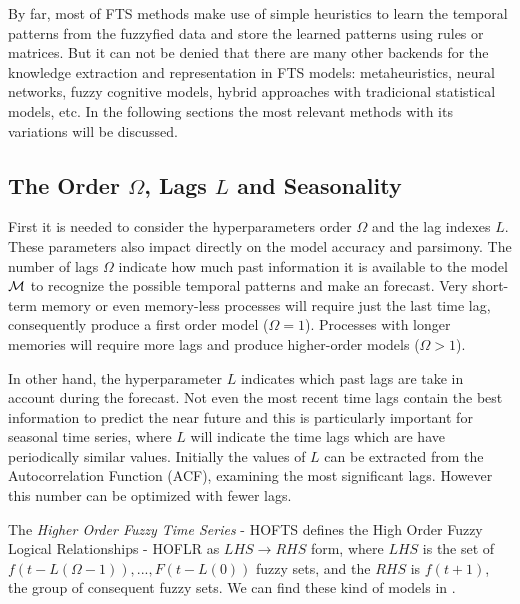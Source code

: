 By far, most of FTS methods make use of simple heuristics to learn the temporal patterns from the fuzzyfied data and store the learned patterns using rules or matrices. But it can not be denied that there are many other backends for the knowledge extraction and representation in FTS models: metaheuristics, neural networks, fuzzy cognitive models, hybrid approaches with tradicional statistical models, etc. In the following sections the most relevant methods with its variations will be discussed. 

%
\subsection{The Order $\Omega$, Lags $L$ and Seasonality}
\label{sec:fts_order}

First it is needed to consider the hyperparameters order $\Omega$ and the lag indexes $L$. These parameters also impact directly on the model accuracy and parsimony. The number of lags $\Omega$ indicate how much past information it is available to the model $\mathcal{M}$ to recognize the possible temporal patterns and make an forecast. Very short-term memory or even memory-less processes will require just the last time lag, consequently produce a first order model ($\Omega = 1$). Processes with longer memories will require more lags and produce higher-order models ($\Omega>1$). 

In other hand, the hyperparameter $L$ indicates which past lags are take in account during the forecast. Not even the most recent time lags contain the best information to predict the near future and this is particularly important for seasonal time series, where $L$ will indicate the time lags which are have periodically similar values. Initially the values of $L$ can be extracted from the Autocorrelation Function (ACF), examining the most significant lags. However this number can be optimized with fewer lags.


The \textit{Higher Order Fuzzy Time Series} - HOFTS  defines the High Order Fuzzy Logical Relationships - HOFLR as $LHS \rightarrow RHS$ form, where $LHS$ is the set of $f(t-L(\Omega-1)), ..., F(t - L(0))$ fuzzy sets, and the $RHS$ is $f(t+1)$, the group of consequent fuzzy sets. We can find these kind of models in \cite{Chen2002, Chen2006a, Jilani2008a, Li2008b, Egrioglu2010, Bahrepour2011, Huang2011, Enayatifar2013, Chen2014, Chen2015a, Ye2016, Lee2017, Bose2017, Jilang2017, Sadaei2017, Guney2018, Cheng2018, Yang2018, Zhang2018a}.


